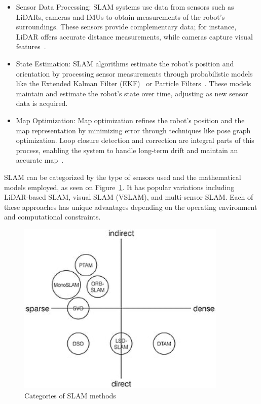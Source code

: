 \begin{itemize}
    \item Sensor Data Processing: SLAM systems use data from sensors such as LiDARs, cameras and IMUs to obtain measurements of the robot’s surroundings. These sensors provide complementary data; for instance, LiDAR offers accurate distance measurements, while cameras capture visual features~\cite{slam_used_sensors}.
    \item State Estimation: SLAM algorithms estimate the robot's position and orientation by processing sensor measurements through probabilistic models like the Extended Kalman Filter (EKF)~\cite{extended_kalman_filter} or Particle Filters~\cite{particle_filter}. These models maintain and estimate the robot’s state over time, adjusting as new sensor data is acquired.
    \item Map Optimization: Map optimization refines the robot’s position and the map representation by minimizing error through techniques like pose graph optimization. Loop closure detection and correction are integral parts of this process, enabling the system to handle long-term drift and maintain an accurate map~\cite{map_optimisation}.
\end{itemize}

SLAM can be categorized by the type of sensors used and the mathematical models employed, as seen on Figure~\ref{fig:slam_categories}. It has popular variations including LiDAR-based SLAM, visual SLAM (VSLAM), and multi-sensor SLAM. Each of these approaches has unique advantages depending on the operating environment and computational constraints.

\FloatBarrier
\begin{figure}[htbp]
	\centering
	\includegraphics[width=100mm, keepaspectratio]{figures_jpg/slam_methods_categorization.jpg}
	\caption{Categories of SLAM methods}
	\label{fig:slam_categories}
\end{figure}
\FloatBarrier


